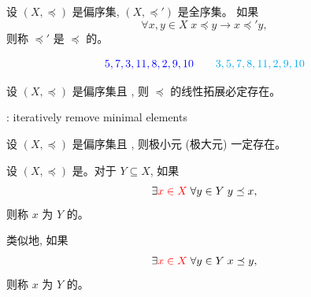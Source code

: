 \begin{frame}{}
  \begin{columns}
  \end{columns}
\end{frame}

\begin{frame}{}
  \begin{definition}
    设 $(X, \preceq)$ 是偏序集, $(X, \preceq')$ 是全序集。
    如果
    \[
      \forall x, y \in X\; x \preceq y \to x \preceq' y,
    \]
    则称 $\preceq'$ 是 $\preceq$ 的。
  \end{definition}


  \pause
  \vspace{-0.50cm}
  \[
    \textcolor{blue}{5, 7, 3, 11, 8, 2, 9, 10} \qquad \textcolor{cyan}{3, 5, 7, 8, 11, 2, 9, 10}
  \]
\end{frame}

\begin{frame}{}
  \begin{theorem}
    设 $(X, \preceq)$ 是偏序集且 , 则 $\preceq$ 的线性拓展必定存在。
  \end{theorem}


  \pause
  \begin{center}
    : iteratively remove minimal elements
  \end{center}

  \pause
  \begin{theorem}
    设 $(X, \preceq)$ 是偏序集且 , 则极小元 (极大元) 一定存在。
  \end{theorem}
\end{frame}

\begin{frame}{}
  \begin{definition}
    设 $(X, \preceq)$ 是。对于 $Y \subseteq X$, 如果
    \[
      \exists \textcolor{red}{x \in X}\; \forall y \in Y\; y \preceq x,
    \]
    则称 $x$ 为 $Y$ 的。

    \pause
    \vspace{0.30cm}
    类似地, 如果
    \[
      \exists \textcolor{red}{x \in X}\; \forall y \in Y\; x \preceq y,
    \]
    则称 $x$ 为 $Y$ 的。
  \end{definition}

  \pause
\end{frame}

